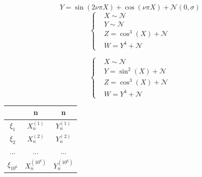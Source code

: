\documentclass[a4paper, 10pt]{beamer}
\begin{document}
\begin{frame}
  \begin{equation*}
    Y = \sin(2\nu \pi X) + \cos(\nu \pi X) + \mathcal{N}(0,\sigma)
  \end{equation*}
  \begin{equation*}
    \begin{cases}
      &X \sim \mathcal{N}\\
      &Y \sim \mathcal{N}\\
      &Z = \cos^3(X) + \mathcal{N}\\
      &W = Y^4 + \mathcal{N}
    \end{cases}
  \end{equation*}

  \begin{equation*}
    \begin{cases}
      &X \sim \mathcal{N}\\
      &Y = \sin^2(X) + \mathcal{N}\\
      &Z = \cos^3(X) + \mathcal{N}\\
      &W = Y^4 + \mathcal{N}
    \end{cases}
  \end{equation*}

\end{frame}
\begin{frame}
  \begin{tabular}{ c | c | c }
    & \textbf{n} & \textbf{n}\\
    \hline
    $\xi_1$ & $X_n^{(1)}$ & $Y_n^{(1)}$ \\
    \hline
    $\xi_2$ & $X_n^{(2)}$ & $Y_n^{(2)}$ \\
    \hline
    ... & ... & ... \\
    \hline
    $\xi_{10^6}$ & $X_n^{(10^6)}$ & $Y_n^{(10^6)}$ \\
    \hline
  \end{tabular}
\end{frame}
\end{document}
